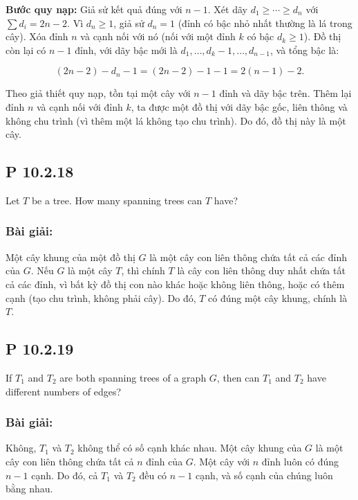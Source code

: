 \documentclass[a4paper,12pt]{article}
\begin{document}
  \textbf{Bước quy nạp:} Giả sử kết quả đúng với \( n - 1 \). Xét dãy \( d_1 \geq \cdots \geq d_n \) với \( \sum d_i = 2n - 2 \). Vì \( d_n \geq 1 \), giả sử \( d_n = 1 \) (đỉnh có bậc nhỏ nhất thường là lá trong cây). Xóa đỉnh \( n \) và cạnh nối với nó (nối với một đỉnh \( k \) có bậc \( d_k \geq 1 \)). Đồ thị còn lại có \( n - 1 \) đỉnh, với dãy bậc mới là \( d_1, \ldots, d_k - 1, \ldots, d_{n-1} \), và tổng bậc là:

  \[
  (2n - 2) - d_n - 1 = (2n - 2) - 1 - 1 = 2(n - 1) - 2.
  \]

  Theo giả thiết quy nạp, tồn tại một cây với \( n - 1 \) đỉnh và dãy bậc trên. Thêm lại đỉnh \( n \) và cạnh nối với đỉnh \( k \), ta được một đồ thị với dãy bậc gốc, liên thông và không chu trình (vì thêm một lá không tạo chu trình). Do đó, đồ thị này là một cây.
  
\subsection*{P 10.2.18}
Let \( T \) be a tree. How many spanning trees can \( T \) have?

\subsubsection*{Bài giải:}
Một cây khung của một đồ thị \( G \) là một cây con liên thông chứa tất cả các đỉnh của \( G \). Nếu \( G \) là một cây \( T \), thì chính \( T \) là cây con liên thông duy nhất chứa tất cả các đỉnh, vì bất kỳ đồ thị con nào khác hoặc không liên thông, hoặc có thêm cạnh (tạo chu trình, không phải cây). Do đó, \( T \) có đúng một cây khung, chính là \( T \).

\subsection*{P 10.2.19}
If \( T_1 \) and \( T_2 \) are both spanning trees of a graph \( G \), then can \( T_1 \) and \( T_2 \) have different numbers of edges?

\subsubsection*{Bài giải:}
Không, \( T_1 \) và \( T_2 \) không thể có số cạnh khác nhau. Một cây khung của \( G \) là một cây con liên thông chứa tất cả \( n \) đỉnh của \( G \). Một cây với \( n \) đỉnh luôn có đúng \( n - 1 \) cạnh. Do đó, cả \( T_1 \) và \( T_2 \) đều có \( n - 1 \) cạnh, và số cạnh của chúng luôn bằng nhau.
\end{document}
